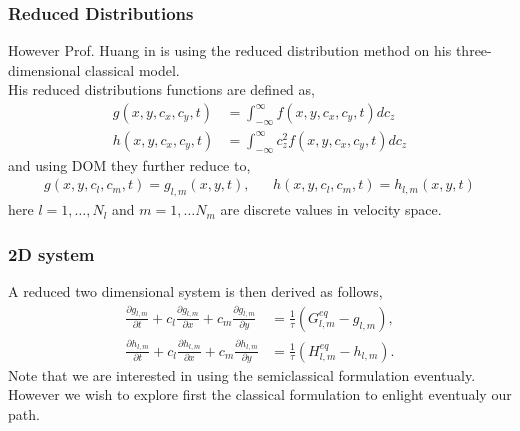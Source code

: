 \begin{frame}
	\frametitle{Reduced Distributions}
	However Prof. Huang in \cite{Huang2011261} is using the reduced distribution method on his three-dimensional classical model.\\
	His reduced distributions functions are defined as,
	\begin{align*}
			g(x,y,c_x,c_y,t) &= \int^{\infty}_{-\infty} f(x,y,c_x,c_y,t) dc_z \\
			h(x,y,c_x,c_y,t) &= \int^{\infty}_{-\infty} c^2_z f(x,y,c_x,c_y,t) dc_z
	\end{align*}
	and using DOM they further reduce to,
	\begin{align*}
			&g(x,y,c_l,c_m,t) = g_{l,m}(x,y,t),& &h(x,y,c_l,c_m,t) = h_{l,m}(x,y,t)&
	\end{align*}
	here $l = 1, \dots ,N_l$ and $m = 1, \dots N_m$ are discrete values in velocity space.
\end{frame}

\begin{frame}
	\frametitle{2D system}
	A reduced two dimensional system is then derived as follows,
	\begin{align*}
	\frac{\partial g_{l,m}}{\partial t} + c_l \frac{\partial g_{l,m}}{\partial x} + c_m \frac{\partial g_{l,m}}{\partial y} &= \frac{1}{\tau}(G^{eq}_{l,m} - g_{l,m}), \\
	\frac{\partial h_{l,m}}{\partial t} + c_l \frac{\partial h_{l,m}}{\partial x} + c_m \frac{\partial h_{l,m}}{\partial y} &= \frac{1}{\tau}(H^{eq}_{l,m} - h_{l,m}).
	\end{align*}
	Note that we are interested in using the semiclassical formulation eventualy. However we wish to explore first the classical formulation to enlight eventualy our path.
\end{frame}

